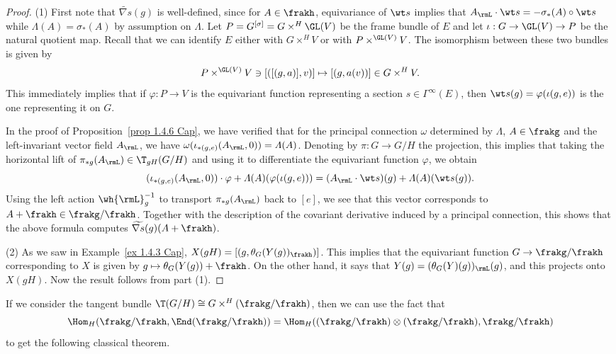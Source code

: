 \begin{proof}
    (1) First note that $\widetilde{\nabla s}(g)$ is well-defined, since for $A\in\frakh$, equivariance of $\wt s$ implies that $A_\rmL\cdot \wt s=-\sigma_\ast(A)\circ \wt s$ while $\varLambda(A)=\sigma_\ast(A)$ by assumption on $\varLambda$. Let $P=G^{[\sigma]}=G\times^H \GL(V)$ be the frame bundle of $E$ and let $\iota:G\to \GL(V)\to P$ be the natural quotient map. Recall that we can identify $E$ either with $G\times^H V$ or with $P\times^{\GL(V)}V$. The isomorphism between these two bundles is given by 
    \[P\times^{\GL(V)} V\ni [([(g,a)],v)]\mapsto [(g,a(v))]\in G\times^H V.\]
    This immediately implies that if $\varphi:P\to V$ is the equivariant function representing a section $s\in\Gamma^\infty(E)$, then $\wt s(g)=\varphi(\iota(g,e))$ is the one representing it on $G$.

    In the proof of Proposition~\ref{prop 1.4.6 Cap}, we have verified that for the principal connection $\omega$ determined by $\varLambda$, $A\in\frakg$  and the left-invariant vector field $A_\rmL$, we have $\omega(\iota_{\ast(g,e)}(A_\rmL,0))=\varLambda(A)$. Denoting by $\pi:G\to G\slash H$ the projection, this implies that taking the horizontal lift of $\pi_{\ast g}(A_\rmL)\in \T_{gH}(G\slash H)$ and using it to differentiate the equivariant function $\varphi$, we obtain 
    \[(\iota_{\ast(g,e)}(A_\rmL,0))\cdot\varphi+\varLambda(A)(\varphi(\iota(g,e)))=(A_\rmL\cdot \wt s)(g)+\varLambda(A)(\wt s(g)).\]
    Using the left action $\wh{\rmL}_g^{-1}$ to transport $\pi_{\ast g}(A_\rmL)$ back to $[e]$, we see that this vector corresponds to $A+\frakh\in\frakg\slash\frakh$. Together with the description of the covariant derivative induced by a principal connection, this shows that the above formula computes $\widetilde{\nabla s}(g)(A+\frakh)$.

    (2) As we saw in Example~\ref{ex 1.4.3 Cap}, $X(gH)=[(g,\theta_G(Y(g))_\frakh)]$. This implies that the equivariant function $G\to \frakg\slash \frakh$ corresponding to $X$ is given by $g\mapsto \theta_G(Y(g))+\frakh$. On the other hand, it says that $Y(g)=(\theta_G(Y)(g))_\rmL(g)$, and this projects onto $X(gH)$. Now the result follows from part (1).
\end{proof}

If we consider the tangent bundle $\T(G\slash H)\cong G\times^{H}(\frakg\slash\frakh)$,  then we can use the fact that 
\[\Hom_H(\frakg\slash\frakh,\End(\frakg\slash\frakh))=\Hom_H((\frakg\slash\frakh)\otimes (\frakg\slash\frakh),\frakg\slash\frakh)\]
to get the following classical theorem.

